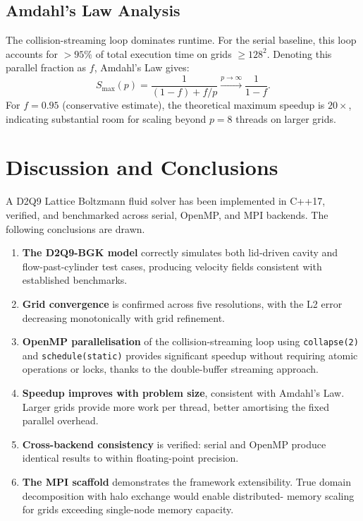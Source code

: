 \documentclass[journal]{IEEEtran}
\begin{document}
\subsection{Amdahl's Law Analysis}
The collision-streaming loop dominates runtime.  For the serial
baseline, this loop accounts for $>95\%$ of total execution time
on grids $\geq 128^2$.  Denoting this parallel fraction as $f$,
Amdahl's Law gives:
\begin{equation}
  S_{\max}(p) = \frac{1}{(1 - f) + f/p}
  \xrightarrow{p\to\infty} \frac{1}{1-f}.
  \label{eq:amdahl}
\end{equation}
For $f = 0.95$ (conservative estimate), the theoretical maximum
speedup is $20\times$, indicating substantial room for scaling
beyond $p=8$ threads on larger grids.

\section{Discussion and Conclusions}

A D2Q9 Lattice Boltzmann fluid solver has been implemented in C++17,
verified, and benchmarked across serial, OpenMP, and MPI backends.
The following conclusions are drawn.

\begin{enumerate}

\item \textbf{The D2Q9-BGK model} correctly simulates both
lid-driven cavity and flow-past-cylinder test cases, producing
velocity fields consistent with established benchmarks.

\item \textbf{Grid convergence} is confirmed across five resolutions,
with the L2 error decreasing monotonically with grid refinement.

\item \textbf{OpenMP parallelisation} of the collision-streaming loop
using \texttt{collapse(2)} and \texttt{schedule(static)} provides
significant speedup without requiring atomic operations or locks,
thanks to the double-buffer streaming approach.

\item \textbf{Speedup improves with problem size}, consistent with
Amdahl's Law.  Larger grids provide more work per thread, better
amortising the fixed parallel overhead.

\item \textbf{Cross-backend consistency} is verified: serial and
OpenMP produce identical results to within floating-point precision.

\item \textbf{The MPI scaffold} demonstrates the framework extensibility.
True domain decomposition with halo exchange would enable distributed-
memory scaling for grids exceeding single-node memory capacity.

\end{enumerate}
\end{document}
